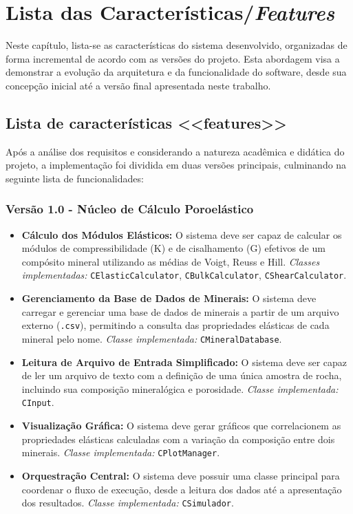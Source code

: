
\chapter{Lista das Características/\emph{Features}\label{chap:Lista-das-Caracter=0000EDsticas}}

Neste capítulo, lista-se as características do sistema desenvolvido, organizadas de forma incremental de acordo com as versões do projeto. Esta abordagem visa a demonstrar a evolução da arquitetura e da funcionalidade do software, desde sua concepção inicial até a versão final apresentada neste trabalho.

\section{Lista de características \textless\textless features\textgreater\textgreater}

Após a análise dos requisitos e considerando a natureza acadêmica e didática do projeto, a implementação foi dividida em duas versões principais, culminando na seguinte lista de funcionalidades:

\subsection*{Versão 1.0 - Núcleo de Cálculo Poroelástico}
\begin{itemize}
    \item \textbf{Cálculo dos Módulos Elásticos:} O sistema deve ser capaz de calcular os módulos de compressibilidade (K) e de cisalhamento (G) efetivos de um compósito mineral utilizando as médias de Voigt, Reuss e Hill.
        \subitem \textit{Classes implementadas:} \texttt{CElasticCalculator}, \texttt{CBulkCalculator}, \texttt{CShearCalculator}.
    
    \item \textbf{Gerenciamento da Base de Dados de Minerais:} O sistema deve carregar e gerenciar uma base de dados de minerais a partir de um arquivo externo (\texttt{.csv}), permitindo a consulta das propriedades elásticas de cada mineral pelo nome.
        \subitem \textit{Classe implementada:} \texttt{CMineralDatabase}.

    \item \textbf{Leitura de Arquivo de Entrada Simplificado:} O sistema deve ser capaz de ler um arquivo de texto com a definição de uma única amostra de rocha, incluindo sua composição mineralógica e porosidade.
        \subitem \textit{Classe implementada:} \texttt{CInput}.
        
    \item \textbf{Visualização Gráfica:} O sistema deve gerar gráficos que correlacionem as propriedades elásticas calculadas com a variação da composição entre dois minerais.
        \subitem \textit{Classe implementada:} \texttt{CPlotManager}.

    \item \textbf{Orquestração Central:} O sistema deve possuir uma classe principal para coordenar o fluxo de execução, desde a leitura dos dados até a apresentação dos resultados.
        \subitem \textit{Classe implementada:} \texttt{CSimulador}.
\end{itemize}

